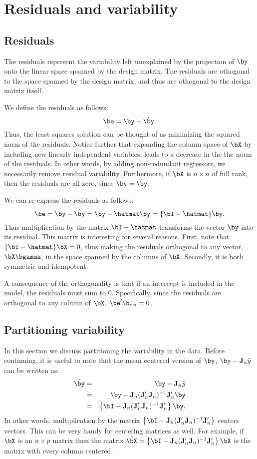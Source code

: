 \section{Residuals and variability}

\subsection{Residuals}


The residuals represent the variability left unexplained by the projection of $\by$
onto the linear space spanned by the design matrix. The residuals
are othogonal to the space spanned by the design matrix, and thus
are othogonal to the design matrix itself.

We define the residuals as follows:
$$
\be = \by - \hat \by.
$$
Thus, the least squares solution can be thought of as minimizing
the squared norm of the residuals. Notice further that 
expanding the column space of $\bX$ by including new
linearly independent variables, leads to a decrease in the the norm of the residuals. 
In other words, by adding non-redundant
regressors, we necessarily remove residual variability. Furthermore,
if $\bX$ is $n \times n$ of full rank, then the residuals
are all zero, since $\by = \hat \by$. 

We can re-express the residuals as follows:
$$
\be = \by - \hat \by = \by - \hatmat \by = \{\bI - \hatmat\} \by.
$$
Thus multiplication by the matrix $\bI - \hatmat$ transforms the
vector $\by$ into its residual. This matrix is interesting for several reasons.
First, note that $\{\bI - \hatmat\} \bX = 0$, thus making the residuals
orthogonal to any vector, $\bX \bgamma$, in the space spanned by the
columns of $\bX$. Secondly, it is both symmetric and idempotent. 

A consequence of the orthogonality is that if an intercept is
included in the model, the residuals must sum to $0$. Specifically,
since the residuals are orthogonal to any column of $\bX$, 
$\be' \bJ_n = 0$.

\subsection{Partitioning variability}

In this section we discuss partitioning the variability in the data. 
Before continuing, it is useful to note 
that the mean centered version of $\by$, 
$ \by -  {\bf J}_n \bar y$
can be written as:
\begin{eqnarray*}
\tilde \by &=& \by - {\bf J}_n \bar y \\
&=& \by - {\bf J}_n({\bf J}_n' {\bf J}_n)^{-1} {\bf J}_n'  \by \\
&=& \left\{ \bI - {\bf J}_n ({\bf J}_n' {\bf J}_n)^{-1} {\bf J}_n' \right\} \by.
\end{eqnarray*}
In other words, multiplication by the matrix $\left\{ \bI - {\bf J}_n ({\bf J}_n' {\bf J}_n)^{-1} {\bf J}_n' \right\}$
centers vectors. This can be very handy for centering matrices as well. For example, if $\bX$ is an $n\times p$
matrix then the matrix $\tilde \bX  = \left\{ \bI - {\bf J}_n ({\bf J}_n' {\bf J}_n)^{-1} {\bf J}_n' \right\} \bX$
is the matrix with every column centered. 

